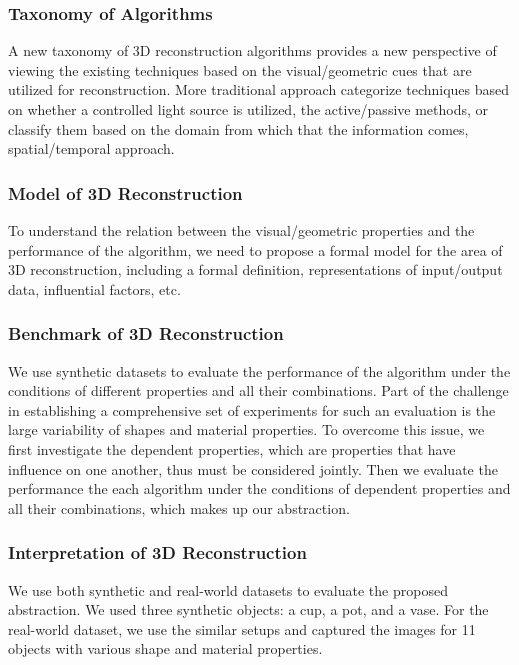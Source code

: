 \subsubsection{Taxonomy of Algorithms}
A new taxonomy of 3D reconstruction algorithms provides a new perspective of viewing the existing techniques based on the visual/geometric cues that are utilized for reconstruction. More traditional approach categorize techniques based on whether a controlled light source is utilized, \ie the active/passive methods, or classify them based on the domain from which that the information comes, \ie spatial/temporal approach.

\subsubsection{Model of 3D Reconstruction}
To understand the relation between the visual/geometric properties and the performance of the algorithm, we need to propose a formal model for the area of 3D reconstruction, including a formal definition, representations of input/output data, influential factors, etc.

\subsubsection{Benchmark of 3D Reconstruction}
We use synthetic datasets to evaluate the performance of the algorithm under the conditions of different properties and all their combinations. Part of the challenge in establishing a comprehensive set of experiments for such an evaluation is the large variability of shapes and material properties. To overcome this issue, we first investigate the dependent properties, which are properties that have influence on one another, thus must be considered jointly. Then we evaluate the performance the each algorithm under the conditions of dependent properties and all their combinations, which makes up our abstraction.

\subsubsection{Interpretation of 3D Reconstruction}
We use both synthetic and real-world datasets to evaluate the proposed abstraction. We used three synthetic objects: a cup, a pot, and a vase. For the real-world dataset, we use the similar setups and captured the images for 11 objects with various shape and material properties.

